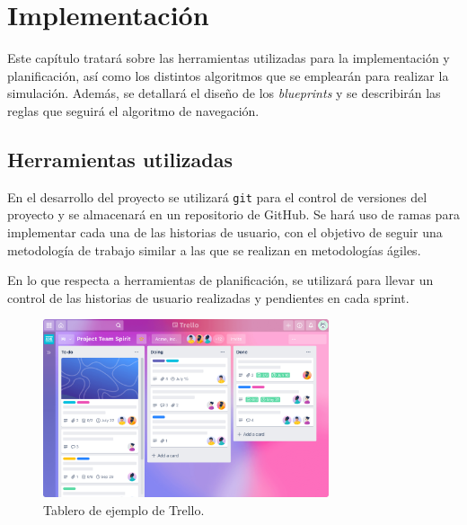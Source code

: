 \chapter{Implementación}

Este capítulo tratará sobre las herramientas utilizadas para la implementación y planificación, así como los distintos algoritmos que se emplearán para realizar la simulación. Además, se detallará el diseño de los \textit{blueprints} y se describirán las reglas que seguirá el algoritmo de navegación.

\section{Herramientas utilizadas}

En el desarrollo del proyecto se utilizará \verb|git| para el control de versiones del proyecto y se almacenará en un repositorio de GitHub. Se hará uso de ramas 
para implementar cada una de las historias de usuario, con el objetivo de seguir una metodología de trabajo similar a las que se realizan en metodologías ágiles.




\bigskip

En lo que respecta a herramientas de planificación, se utilizará \planApp para llevar un control de las historias de usuario realizadas y pendientes en cada sprint.

\begin{figure}[H]
    \centering
    \includegraphics[width=0.75\textwidth]{imagenes/trello.png}
    \caption{Tablero de ejemplo de Trello\cite{tablero-trello}.}
\end{figure}

